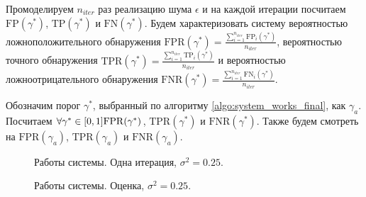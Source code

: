 \documentclass[specialist, substylefile = spbu.rtx,
			   subf, href, 12pt]{disser}
\begin{document}
Промоделируем $ n_{iter} $ раз реализацию шума $ \epsilon $ и на каждой итерации посчитаем $ \mathrm{FP}(\gamma^*) $, $ \mathrm{TP}(\gamma^*) $ и $ \mathrm{FN}(\gamma^*) $. Будем характеризовать систему вероятностью ложноположительного обнаружения $ \mathrm{FPR}(\gamma^*) = \frac{\sum\limits_{i=1}^{n_{iter}}\mathrm{FP}_i(\gamma^*)}{n_{iter}} $, вероятностью точного обнаружения $ \mathrm{TPR}(\gamma^*) = \frac{\sum\limits_{i=1}^{n_{iter}}\mathrm{TP}_i(\gamma^*)}{n_{iter}} $ и вероятностью ложноотрицательного обнаружения $ \mathrm{FNR}(\gamma^*) = \frac{\sum\limits_{i=1}^{n_{iter}}\mathrm{FN}_i(\gamma^*)}{n_{iter}} $.

Обозначим порог $ \gamma^* $, выбранный по алгоритму \ref{algo:system_works_final}, как $ \gamma_a $. Посчитаем $ \forall \gamma^* \in [0, 1] \;\newline \mathrm{FPR}(\gamma^*)$, $ \mathrm{TPR}(\gamma^*) $ и $ \mathrm{FNR}(\gamma^*) $. Также будем смотреть на $ \mathrm{FPR}(\gamma_a)$, $ \mathrm{TPR}(\gamma_a) $ и $ \mathrm{FNR}(\gamma_a) $.

\begin{figure}[!hhh]
	\caption{Работы системы. Одна итерация, $ \sigma^2=0.25 $.}
	\label{pic:system_estimation_one_iter}
\end{figure}

\begin{figure}[!hhh]
	\caption{Работы системы. Оценка, $ \sigma^2=0.25 $.}
	\label{pic:system_estimation}
\end{figure}
\end{document}
